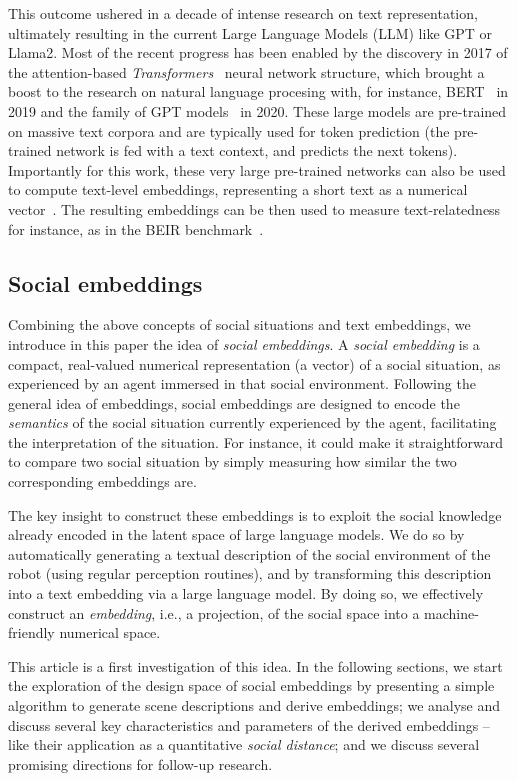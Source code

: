 \begin{rewrite}
This outcome ushered in a decade of intense research on text representation,
ultimately resulting in the current Large Language Models (LLM) like GPT or
Llama2.  Most of the recent progress has been enabled by the discovery in 2017
of the attention-based \emph{Transformers}~\cite{vaswani2017attention} neural
network structure, which brought a boost to the research on natural language
procesing with, for instance, BERT~\cite{devlin2019bert} in 2019 and the family
of GPT models~\cite{wolf2020transformers} in 2020.  These large models
are pre-trained on massive text corpora and are typically used for token
prediction (the pre-trained network is fed with a text context, and predicts the
next tokens).  Importantly for this work, these very large pre-trained networks
can also be used to compute text-level embeddings, representing a short text as
a numerical vector~\cite{reimers2019sentencebert,muennighoff2022sgpt}. The
resulting embeddings can be then used to measure text-relatedness for instance,
as in the BEIR benchmark~\cite{thakur2021beir}.

\end{rewrite}

\subsection{Social embeddings}

\begin{rewrite}
Combining the above concepts of social situations and text embeddings, we introduce in
this paper the idea of \emph{social embeddings}. A \emph{social embedding} is a
compact, real-valued numerical representation (a vector) of a social
situation, as experienced by an agent immersed in that social environment.
Following the general idea of embeddings, social embeddings are designed
to encode the \emph{semantics} of the social situation currently experienced by
the agent, facilitating the interpretation of the situation. For instance, it
could make it straightforward to compare two social situation by simply
measuring how similar the two corresponding embeddings are.

The key insight to construct these embeddings is to exploit the social knowledge
already encoded in the latent space of large language models. We do so by
automatically generating a textual description of the social environment of the
robot (using regular perception routines), and by transforming this
description into a text embedding via a large language model. By doing so, we
effectively construct an \emph{embedding}, i.e., a projection, of the social
space into a machine-friendly numerical space.

This article is a first investigation of this idea. In the following sections,
we start the exploration of the design space of social embeddings by presenting
a simple algorithm to generate scene descriptions and derive embeddings; we
analyse and discuss several key characteristics and parameters of the derived
embeddings -- like their application as a quantitative \emph{social distance};
and we discuss several promising directions for follow-up research.

\end{rewrite}


